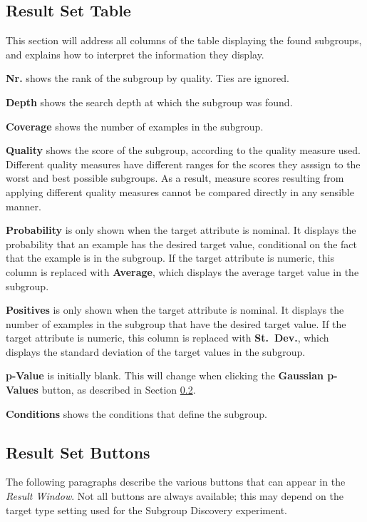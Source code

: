 \documentclass{article}
\begin{document}
\subsection{Result Set Table}

This section will address all columns of the table displaying the found
subgroups, and explains how to interpret the information they display.

\textbf{Nr.} shows the rank of the subgroup by quality.  Ties are ignored.

\textbf{Depth} shows the \gls{search depth} at which the subgroup was
found.  

\textbf{Coverage} shows the number of examples in the subgroup.  

\textbf{Quality} shows the score of the subgroup, according to the quality
measure used.  Different quality measures have different ranges for the
scores they asssign to the worst and best possible subgroups.  As a result,
measure scores resulting from applying different quality measures cannot be
compared directly in any sensible manner.

\textbf{Probability} is only shown when the target attribute is
\gls{nominal}. It displays the probability that an example has the desired
target value, conditional on the fact that the example is in the subgroup. 
If the target attribute is \gls{numeric}, this column is replaced with
\textbf{Average}, which displays the average target value in the subgroup.

\textbf{Positives} is only shown when the target attribute is \gls{nominal}.
It displays the number of examples in the subgroup that have the desired
target value. If the target attribute is \gls{numeric}, this column is
replaced with \textbf{St.~Dev.}, which displays the standard deviation of
the target values in the subgroup.

\textbf{p-Value} is initially blank. This will change when clicking the
\textbf{Gaussian p-Values} button, as described in Section
\ref{sec:buttons}.

\textbf{Conditions} shows the conditions that define the subgroup.

\subsection{Result Set Buttons}
\label{sec:buttons}

The following paragraphs describe the various buttons that can appear in the
\emph{Result Window}.  Not all buttons are always available; this may depend
on the target type setting used for the Subgroup Discovery experiment. 
\end{document}
